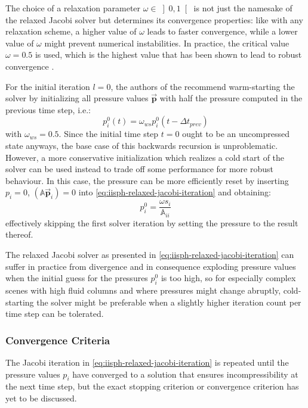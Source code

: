 \documentclass[oneside, a4paper]{book}
\newcommand\vek[1]{\vec{\bm{#1}}}
\newcommand\mat[1]{{\mathds{#1}}}
\newcommand\br[1]{\left(#1\right)}
\begin{document}
    The choice of a relaxation parameter $\omega\in\left]0,1\right[$ is not just the namesake of the relaxed Jacobi solver but determines its convergence properties: like with any relaxation scheme, a higher value of $\omega$ leads to faster convergence, while a lower value of $\omega$ might prevent numerical instabilities. In practice, the critical value $\omega=0.5$ is used, which is the highest value that has been shown to lead to robust convergence \autocite{iisph}.

    For the initial iteration $l=0$, the authors of the \autocite[original paper]{iisph} recommend warm-starting the solver by initializing all pressure values $\vek{p}$ with half the pressure computed in the previous time step, i.e.:
    \begin{equation}
      p^0_i\br{t} = \omega_{ws}p^0_i\br{t-\Delta t_{prev}}
      \label{eq:iisph-warm-start}
    \end{equation}
    with $\omega_{ws}=0.5$. Since the initial time step $t=0$ ought to be an uncompressed state anyways, the base case of this backwards recursion is unproblematic. However, a more conservative initialization which realizes a cold start of the solver can be used instead to trade off some performance for more robust behaviour. In this case, the pressure can be more efficiently reset by inserting $p_i=0$, $\br{\mat{A}\vek{p}_i} = 0$ into \autoref{eq:iisph-relaxed-jacobi-iteration} and obtaining:
    \begin{equation}\label{eq:cold-start-pressure-init}
      p_i^0 = \frac{\omega s_i}{\mat{A}_{ii}}
    \end{equation}
    effectively skipping the first solver iteration by setting the pressure to the result thereof.
    
    The relaxed Jacobi solver as presented in \autoref{eq:iisph-relaxed-jacobi-iteration} can suffer in practice from divergence and in consequence exploding pressure values when the initial guess for the pressures $p_i^0$ is too high, so for especially complex scenes with high fluid columns and where pressures might change abruptly, cold-starting the solver might be preferable when a slightly higher iteration count per time step can be tolerated.


  \subsubsection{Convergence Criteria}\label{subsec:iisph-convergence}
  The Jacobi iteration in \autoref{eq:iisph-relaxed-jacobi-iteration} is repeated until the pressure values $p_i$ have converged to a solution that ensures incompressibility at the next time step, but the exact stopping criterion or convergence criterion has yet to be discussed. 
\end{document}
